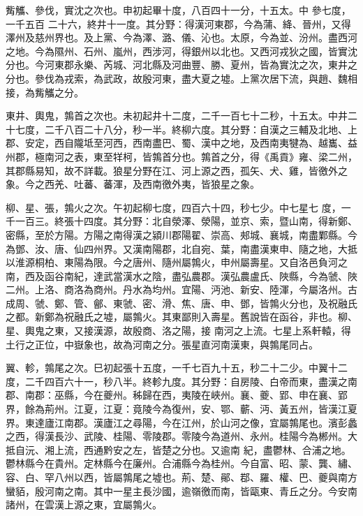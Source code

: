 \begin{pinyinscope}
 觜觿、參伐，實沈之次也。申初起畢十度，八百四十一分，十五太。中
 參七度，
 一千五百
 二十六，終井十一度。其分野：得漢河東郡，今為蒲、絳、晉州，又得澤州及慈州界也。及上黨、今為澤、潞、儀、沁也。太原，今為並、汾州。盡西河之地。今為隰州、石州、嵐州，西涉河，得銀州以北也。又西河戎狄之國，皆實沈分也。今河東郡永樂、芮城、河北縣及河曲豐、勝、夏州，皆為實沈之次，東井之分也。參伐為戎索，為武政，故殷河東，盡大夏之墟。上黨次居下流，與趙、魏相接，為觜觿之分。



 東井、輿鬼，鶉首之次也。未初起井十二度，二千一百七十二秒，十五太。中井二十七度，二千八百二十八分，秒一半。終柳六度。其分野：自漢之三輔及北地、上郡、安定，西自隴坻至河西，西南盡巴、蜀、漢中之地，及西南夷犍為、越巂、益州郡，極南河之表，東至䍧柯，皆鶉首分也。鶉首之分，得《禹貢》雍、梁二州，其郡縣易知，故不詳載。狼星分野在江、河上源之西，孤矢、犬、雞，皆徼外之象。今之西羌、吐蕃、蕃渾，及西南徼外夷，皆狼星之象。



 柳、星、張，鶉火之次。午初起柳七度，四百六十四，秒七少。中七星七
 度，一千一百三。終張十四度。其分野：北自滎澤、滎陽，並京、索，暨山南，得新鄭、密縣，至於方陽。方陽之南得漢之潁川郡陽翟、崇高、郟城、襄城，南盡鄴縣。今為鄧、汝、唐、仙四州界。又漢南陽郡，北自宛、葉，南盡漢東申、隨之地，大抵以淮源桐柏、東陽為限。今之唐州、隨州屬鶉火，申州屬壽星。又自洛邑負河之南，西及函谷南紀，達武當漢水之陰，盡弘農郡。漢弘農盧氏、陜縣，今為虢、陜二州。上洛、商洛為商州。丹水為均州。宜陽、沔池、新安、陸渾，今屬洛州。古成周、虢、鄭、管、鄶、東虢、密、滑、焦、唐、申、鄧，皆鶉火分也，及祝融氏之都。新鄭為祝融氏之墟，屬鶉火。其東鄙則入壽星。舊說皆在函谷，非也。柳、星、輿鬼之東，又接漢源，故殷商、洛之陽，接
 南河之上流。七星上系軒轅，得土行之正位，中嶽象也，故為河南之分。張星直河南漢東，與鶉尾同占。



 翼、軫，鶉尾之次。巳初起張十五度，一千七百九十五，秒二十二少。中翼十二度，二千四百六十一，秒八半。終軫九度。其分野：自房陵、白帝而東，盡漢之南郡、南郡：巫縣，今在夔州。秭歸在西，夷陵在峽州。襄、夔、郢、申在襄、郢界，餘為荊州。江夏，江夏：竟陵今為復州，安、鄂、蘄、沔、黃五州，皆漢江夏界。東達廬江南郡。漢廬江之尋陽，今在江州，於山河之像，宜屬鶉尾也。濱彭蠡之西，得漢長沙、武陵、桂陽、零陵郡。零陵今為道州、永州。桂陽今為郴州。大抵自沅、湘上流，西通黔安之左，皆楚之分也。又逾南
 紀，盡鬱林、合浦之地。鬱林縣今在貴州。定林縣今在廉州。合浦縣今為桂州。今自富、昭、蒙、龔、繡、容、白、罕八州以西，皆屬鶉尾之墟也。荊、楚、鄖、鄀、羅、權、巴、夔與南方蠻貊，殷河南之南。其中一星主長沙國，逾嶺徼而南，皆甌東、青丘之分。今安南諸州，在雲漢上源之東，宜屬鶉火。




\end{pinyinscope}
